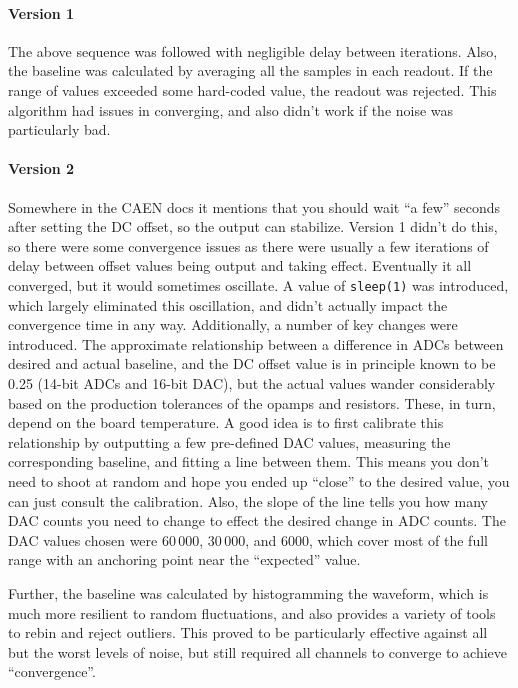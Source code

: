 \paragraph{Version 1}

The above sequence was followed with negligible delay between iterations.
Also, the baseline was calculated by averaging all the samples in each readout.
If the range of values exceeded some hard-coded value, the readout was rejected.
This algorithm had issues in converging, and also didn't work if the noise was particularly bad.

\paragraph{Version 2}

Somewhere in the CAEN docs it mentions that you should wait ``a few'' seconds after setting the DC offset, so the output can stabilize.
Version 1 didn't do this, so there were some convergence issues as there were usually a few iterations of delay between offset values being output and taking effect.
Eventually it all converged, but it would sometimes oscillate.
A value of \texttt{sleep(1)} was introduced, which largely eliminated this oscillation, and didn't actually impact the convergence time in any way.
Additionally, a number of key changes were introduced.
The approximate relationship between a difference in ADCs between desired and actual baseline, and the DC offset value is in principle known to be 0.25 (14-bit ADCs and 16-bit DAC), but the actual values wander considerably based on the production tolerances of the opamps and resistors.
These, in turn, depend on the board temperature.
A good idea is to first calibrate this relationship by outputting a few pre-defined DAC values, measuring the corresponding baseline, and fitting a line between them.
This means you don't need to shoot at random and hope you ended up ``close'' to the desired value, you can just consult the calibration.
Also, the slope of the line tells you how many DAC counts you need to change to effect the desired change in ADC counts.
The DAC values chosen were $60\,000$, $30\,000$, and $6000$, which cover most of the full range with an anchoring point near the ``expected'' value.

Further, the baseline was calculated by histogramming the waveform, which is much more resilient to random fluctuations, and also provides a variety of tools to rebin and reject outliers.
This proved to be particularly effective against all but the worst levels of noise, but still required all channels to converge to achieve ``convergence''.

